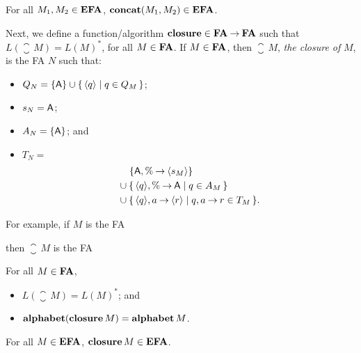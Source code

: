 \begin{proposition}
For all $M_1,M_2\in\mathbf{EFA}$, $\mathbf{concat}(M_1,M_2)\in\mathbf{EFA}$.
\end{proposition}

%
%
%
Next, we define a function/algorithm $\mathbf{closure}\in\mathbf{FA}\mathbin{\to}\mathbf{FA}$ such that
$L(\closure\,M)=L(M)^*$, for all $M\in\mathbf{FA}$.  If $M\in\mathbf{FA}$, then
$\closure\,M$, \emph{the closure of} $M$, is the FA $N$ such that:
\begin{itemize}
\item $Q_N=\{\mathsf{A}\}\cup\{ \, \langle q\rangle \mid q\in Q_M \, \}$;

\item $s_N=\mathsf{A}$;

\item $A_N=\{\mathsf{A}\}$; and

\item $T_N={}$
  \begin{align*}
    &\quad\, \{\mathsf{A},\%\mathbin{\to}\langle s_M\rangle\} \\
    &\cup \{ \, \langle q\rangle,\%\mathbin{\to}\mathsf{A} \mid q\in A_M \, \} \\
    &\cup \{ \, \langle q\rangle,a\mathbin{\to}\langle r\rangle \mid q,a\mathbin{\to} r\in
      T_M \, \}.
  \end{align*}
\end{itemize}

For example, if $M$ is the FA
\begin{center}

\end{center}
then $\closure\,M$ is the FA
\begin{center}

\end{center}

\begin{proposition}
For all $M\in\mathbf{FA}$,
\begin{itemize}
\item $L(\closure\,M)=L(M)^*$; and

\item $\mathbf{alphabet}(\mathbf{closure}\,M)=\mathbf{alphabet}\,M$.
\end{itemize}
\end{proposition}

\begin{proposition}
For all $M\in\mathbf{EFA}$, $\mathbf{closure}\,M\in\mathbf{EFA}$.
\end{proposition}

